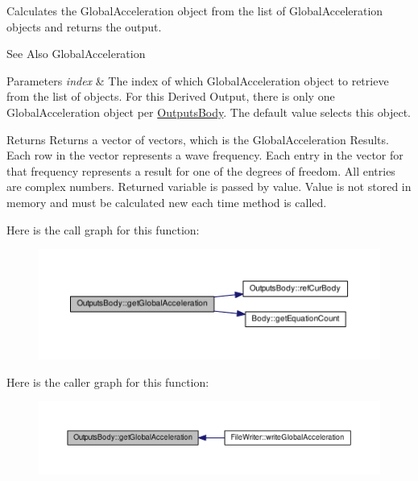 Calculates the Global\-Acceleration object from the list of Global\-Acceleration objects and returns the output. 

\begin{DoxySeeAlso}{See Also}
Global\-Acceleration 
\end{DoxySeeAlso}

\begin{DoxyParams}{Parameters}
{\em index} & The index of which Global\-Acceleration object to retrieve from the list of objects. For this Derived Output, there is only one Global\-Acceleration object per \hyperlink{class_outputs_body}{Outputs\-Body}. The default value selects this object. \\
\hline
\end{DoxyParams}
\begin{DoxyReturn}{Returns}
Returns a vector of vectors, which is the Global\-Acceleration Results. Each row in the vector represents a wave frequency. Each entry in the vector for that frequency represents a result for one of the degrees of freedom. All entries are complex numbers. Returned variable is passed by value. Value is not stored in memory and must be calculated new each time method is called. 
\end{DoxyReturn}


Here is the call graph for this function\-:\nopagebreak
\begin{figure}[H]
\begin{center}
\leavevmode
\includegraphics[width=350pt]{class_outputs_body_a9c4de0023e30be8e03c4f910a3848bdc_cgraph}
\end{center}
\end{figure}




Here is the caller graph for this function\-:\nopagebreak
\begin{figure}[H]
\begin{center}
\leavevmode
\includegraphics[width=350pt]{class_outputs_body_a9c4de0023e30be8e03c4f910a3848bdc_icgraph}
\end{center}
\end{figure}


